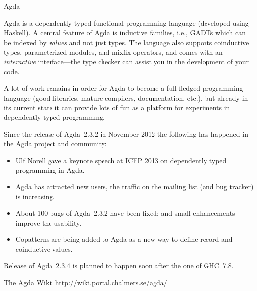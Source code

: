 \begin{hcarentry}{Agda}
\label{agda}
\makeheader

Agda is a dependently typed functional programming language (developed
using Haskell). A central feature of Agda is inductive families,
i.e., GADTs which can be indexed by \emph{values} and not just types.
The language also supports coinductive types, parameterized modules,
and mixfix operators, and comes with an \emph{interactive}
interface---the type checker can assist you in the development of your
code.

A lot of work remains in order for Agda to become a full-fledged
programming language (good libraries, mature compilers, documentation,
etc.), but already in its current state it can provide lots of fun as
a platform for experiments in dependently typed programming.

Since the release of Agda~2.3.2 in November 2012 the following has
happened in the Agda project and community:
\begin{itemize}
\item Ulf Norell gave a keynote speech at ICFP 2013 on dependently
  typed programming in Agda.
\item Agda has attracted new users, the traffic on the mailing list
  (and bug tracker) is increasing.
\item About 100 bugs of Agda~2.3.2 have been fixed; and small
  enhancements improve the usability.
\item Copatterns are being added to Agda as a new way to define record
  and coinductive values.
\end{itemize}
Release of Agda~2.3.4 is planned to happen soon after the one of GHC~7.8.

\FurtherReading
  The Agda Wiki: \url{http://wiki.portal.chalmers.se/agda/}
\end{hcarentry}


